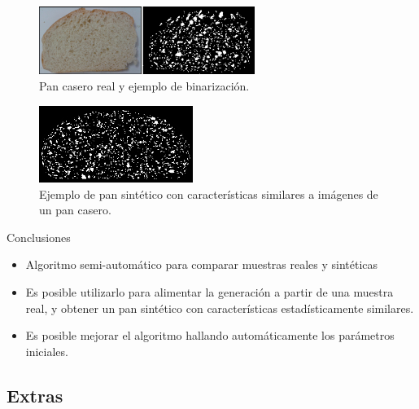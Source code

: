 \documentclass[spanish]{beamer}
\begin{document}
\begin{frame}

\begin{figure}
\begin{center}
\includegraphics[width=7cm]{../figures/realbin2}
\caption{ Pan casero real y ejemplo de binarización.}
\label{realbin2}
\end{center}
\end{figure}

\begin{figure}
\begin{center}
\includegraphics[width=5cm]{../figures/best2}
\caption{Ejemplo de pan sintético con características similares a imágenes de un pan casero.}
\label{best2}
\end{center}
\end{figure}
\end{frame}



\begin{frame}{Conclusiones}
\begin{block}{}
\begin{itemize}
\item Algoritmo semi-automático para comparar muestras reales y sintéticas
\item Es posible utilizarlo para alimentar la generación a partir de una muestra real, y obtener un pan sintético con características estadísticamente similares.
\item Es posible mejorar el algoritmo hallando automáticamente los parámetros iniciales.
\end{itemize}
\end{block}

\end{frame}

\subsection{Extras}
\end{document}
